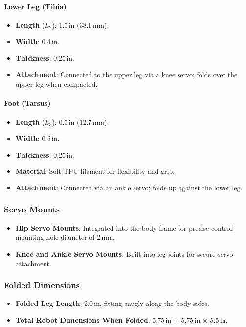 \documentclass{article}
\begin{document}
\paragraph{Lower Leg (Tibia)}

\begin{itemize}
    \item \textbf{Length} ($L_2$): 1.5\,in (38.1\,mm).
    \item \textbf{Width}: 0.4\,in.
    \item \textbf{Thickness}: 0.25\,in.
    \item \textbf{Attachment}: Connected to the upper leg via a knee servo; folds over the upper leg when compacted.
\end{itemize}

\paragraph{Foot (Tarsus)}

\begin{itemize}
    \item \textbf{Length} ($L_3$): 0.5\,in (12.7\,mm).
    \item \textbf{Width}: 0.5\,in.
    \item \textbf{Thickness}: 0.25\,in.
    \item \textbf{Material}: Soft TPU filament for flexibility and grip.
    \item \textbf{Attachment}: Connected via an ankle servo; folds up against the lower leg.
\end{itemize}

\subsubsection{Servo Mounts}

\begin{itemize}
    \item \textbf{Hip Servo Mounts}: Integrated into the body frame for precise control; mounting hole diameter of 2\,mm.
    \item \textbf{Knee and Ankle Servo Mounts}: Built into leg joints for secure servo attachment.
\end{itemize}

\subsubsection{Folded Dimensions}

\begin{itemize}
    \item \textbf{Folded Leg Length}: 2.0\,in, fitting snugly along the body sides.
    \item \textbf{Total Robot Dimensions When Folded}: 5.75\,in $\times$ 5.75\,in $\times$ 5.5\,in.
\end{itemize}
\end{document}
